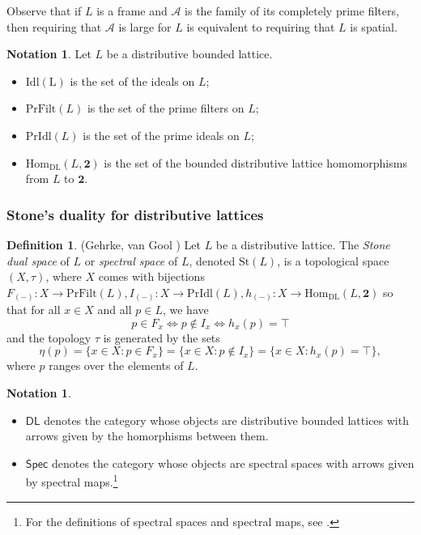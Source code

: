 \documentclass{article}
\theoremstyle{plain}
\theoremstyle{definition}
\newtheorem{definition}[theorem]{Definition}
\newtheorem{notation}[theorem]{Notation}
\theoremstyle{remark}
\newcommand{\bool}[1]{\mathsf{#1}}
\newcommand{\0}{\mathbbm 0}
\newcommand{\1}{\mathbbm 1}
\newcommand{\2}{\mathbbm 2}
\begin{document}
Observe that if $L$ is a frame and $\mathcal{A}$ is the family of its completely prime filters, then requiring that $\mathcal{A}$ is large for $L$ is equivalent to requiring that $L$ is spatial. \\

\begin{notation}
    \label{not:stonedualspace}
    Let $L$ be a distributive bounded lattice.  
\begin{itemize}
    \item $\mathrm{Idl(L)}$ is the set of the ideals on \(L\);
    \item $\mathrm{PrFilt}(L)$ is the set of the prime filters on $L$;
    \item $\mathrm{PrIdl}(L)$  is the set of the prime ideals on $L$; 
    \item $\mathrm{Hom_{DL}}(L, \textbf{2})$ is the set of the bounded distributive lattice homomorphisms from $L$ to $\textbf{2}$. 
\end{itemize}
\end{notation}

\subsubsection{Stone's duality for distributive lattices}

\begin{definition}(Gehrke, van Gool \cite[Def 6.3]{gehrke2024topological})
\label{def:stonedualspace}
 Let \( L \) be a distributive lattice. The \emph{Stone dual space} of \( L \) or \emph{spectral space} of \( L \), denoted \( \mathrm{St}(L) \), is a topological space \( (X, \tau) \), where \( X \) comes with bijections $ F_{(-)}: X \to \mathrm{PrFilt}(L),  I_{(-)}: X \to \mathrm{PrIdl}(L) ,  h_{(-)}: X \to \mathrm{Hom_{DL}}(L, \textbf{2}) $ so that for all \( x \in X \) and all \( p\in L \), we have
\[
p \in F_x \iff p \notin I_x \iff h_x(p) = \top
\]
and the topology \( \tau \) is generated by the sets
\[
\eta(p) = \{ x \in X : p \in F_x \} = \{ x \in X : p \notin I_x \} = \{ x \in X : h_x(p) = \top \},
\]
where \( p \) ranges over the elements of \( L \).
\end{definition}

\begin{notation}
\label{not:DL-Spec}
\emph{}
\begin{itemize}
\item
\label{not:DL}
$\bool{DL}$ denotes the category whose objects are distributive bounded lattices with arrows given by the homorphisms between them.
\item
\label{not:Spec}
$\bool{Spec}$ denotes the category whose objects are spectral spaces with arrows given by spectral maps.\footnote{For the definitions of spectral spaces and spectral maps, see \cite[Def 6.2]{gehrke2024topological}.}
\end{itemize}
\end{notation}
\end{document}
